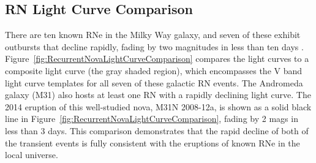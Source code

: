 \subsection{RN Light Curve Comparison}\label{sec:RNLightCurves}


There are ten known RNe in the Milky Way galaxy, and seven of
these exhibit outbursts that decline rapidly, fading by two magnitudes
in less than ten days \citep{Schaefer:2010}. 
Figure~\ref{fig:RecurrentNovaLightCurveComparison} compares the \spock
light curves to a composite light curve (the gray shaded region),
which encompasses the V band light curve templates
\citep{Schaefer:2010} for all seven of these galactic RN events.  The
Andromeda galaxy (M31) also hosts at least one RN with a rapidly
declining light curve.  The 2014 eruption of this well-studied nova,
M31N 2008-12a, is shown as a solid black line in
Figure~\ref{fig:RecurrentNovaLightCurveComparison}, fading by 2 mags
in less than 3 days.  This comparison demonstrates that the rapid
decline of both of the \spock transient events is fully consistent
with the eruptions of known RNe in the local universe.



